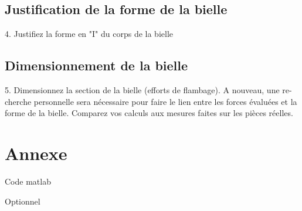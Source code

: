 \documentclass[a4paper,oneside,12pt]{report}
\begin{document}
\section{Justification de la forme de la bielle}
4. Justifiez la forme en "I" du corps de la bielle

\section{Dimensionnement de la bielle}
5. Dimensionnez la section de la bielle (efforts de flambage). A nouveau, une re-
cherche personnelle sera nécessaire pour faire le lien entre les forces évaluées
et la forme de la bielle. Comparez vos calculs aux mesures faites sur les pièces
réelles.

\chapter{Annexe}
Code matlab

Optionnel
\end{document}

